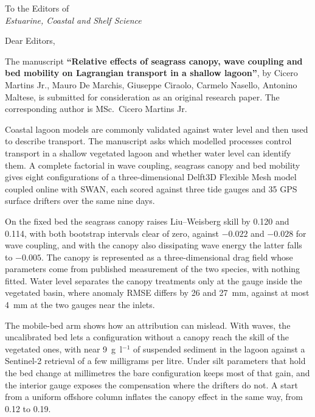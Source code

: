 \documentclass[11pt]{article}
\begin{document}
\thispagestyle{fancy}

\vspace{0.3cm}
\begin{flushright}
To the Editors of\\
\textit{Estuarine, Coastal and Shelf Science}
\end{flushright}

\vspace{0.5cm}
Dear Editors,

\vspace{0.2cm}
The manuscript \textbf{``Relative effects of seagrass canopy, wave coupling and bed mobility on Lagrangian transport in a shallow lagoon''}, by Cicero Martins Jr., Mauro De Marchis, Giuseppe Ciraolo, Carmelo Nasello, Antonino Maltese, is
submitted for consideration as an original research paper. The corresponding
author is MSc.\ Cicero Martins Jr.

\vspace{0.3cm}
Coastal lagoon models are commonly validated against water level and then used
to describe transport. The manuscript asks which modelled processes control
transport in a shallow vegetated lagoon and whether water level can identify
them. A complete factorial in wave coupling, seagrass canopy and bed mobility
gives eight configurations of a three-dimensional Delft3D Flexible Mesh model
coupled online with SWAN, each scored against three tide gauges and 35 GPS
surface drifters over the same nine days.

On the fixed bed the seagrass canopy raises Liu--Weisberg skill by 0.120 and
0.114, with both bootstrap intervals clear of zero, against $-0.022$ and
$-0.028$ for wave coupling, and with the canopy also dissipating wave energy the
latter falls to $-0.005$. The canopy is represented as a three-dimensional
drag field whose parameters come from published measurement of the two species,
with nothing fitted. Water level separates the canopy treatments only at the
gauge inside the vegetated basin, where anomaly RMSE differs by 26 and 27~mm,
against at most 4~mm at the two gauges near the inlets.

The mobile-bed arm shows how an attribution can mislead. With waves, the
uncalibrated bed lets a configuration without a canopy reach the skill of the
vegetated ones, with near 9~g~l$^{-1}$ of suspended sediment in the lagoon
against a Sentinel-2 retrieval of a few milligrams per litre. Under silt
parameters that hold the bed change at millimetres the bare configuration keeps
most of that gain, and the interior gauge exposes the compensation where the
drifters do not. A start from a
uniform offshore column inflates the canopy effect in the same way, from 0.12
to 0.19.
\end{document}
